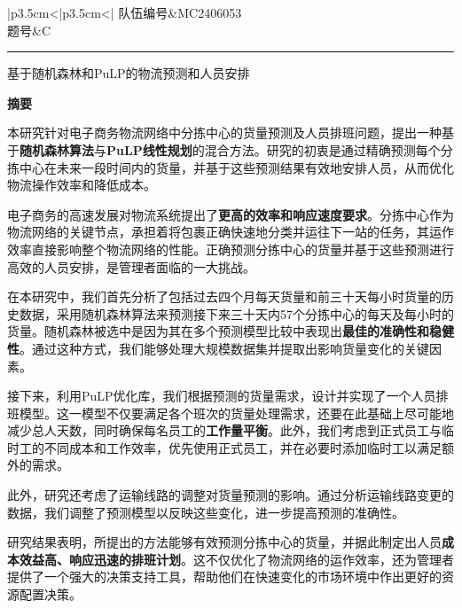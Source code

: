 \documentclass[UTF8]{article}%
\begin{document}
	\setlength{\lineskip}{8pt}
	\setlength{\lineskiplimit}{8pt}
    
\begin{table}[!ht]
    \renewcommand\arraystretch{1.5}
    \centering  
    \begin{tabular}{|p{3.5cm}<{\centering}|p{3.5cm}<{\centering}|}
        \hline
        {队伍编号}&MC2406053\\
        \hline
        题号&C\\
        \hline        
    \end{tabular}
\end{table}

\setcounter{page}{1}

\noindent\rule{\linewidth}{1pt}
\begin{center}
    \Large 基于随机森林和PuLP的物流预测和人员安排
\end{center}
\begin{center}
    \large\bf 摘要
\end{center}

本研究针对电子商务物流网络中分拣中心的货量预测及人员排班问题，提出一种基于{\bf 随机森林算法}与{\bf PuLP线性规划}的混合方法。研究的初衷是通过精确预测每个分拣中心在未来一段时间内的货量，并基于这些预测结果有效地安排人员，从而优化物流操作效率和降低成本。

电子商务的高速发展对物流系统提出了{\bf 更高的效率和响应速度要求}。分拣中心作为物流网络的关键节点，承担着将包裹正确快速地分类并运往下一站的任务，其运作效率直接影响整个物流网络的性能。正确预测分拣中心的货量并基于这些预测进行高效的人员安排，是管理者面临的一大挑战。

在本研究中，我们首先分析了包括过去四个月每天货量和前三十天每小时货量的历史数据，采用随机森林算法来预测接下来三十天内57个分拣中心的每天及每小时的货量。随机森林被选中是因为其在多个预测模型比较中表现出{\bf 最佳的准确性和稳健性}。通过这种方式，我们能够处理大规模数据集并提取出影响货量变化的关键因素。

接下来，利用PuLP优化库，我们根据预测的货量需求，设计并实现了一个人员排班模型。这一模型不仅要满足各个班次的货量处理需求，还要在此基础上尽可能地减少总人天数，同时确保每名员工的{\bf 工作量平衡}。此外，我们考虑到正式员工与临时工的不同成本和工作效率，优先使用正式员工，并在必要时添加临时工以满足额外的需求。

此外，研究还考虑了运输线路的调整对货量预测的影响。通过分析运输线路变更的数据，我们调整了预测模型以反映这些变化，进一步提高预测的准确性。

研究结果表明，所提出的方法能够有效预测分拣中心的货量，并据此制定出人员{\bf 成本效益高、响应迅速的排班计划}。这不仅优化了物流网络的运作效率，还为管理者提供了一个强大的决策支持工具，帮助他们在快速变化的市场环境中作出更好的资源配置决策。
\end{document}
